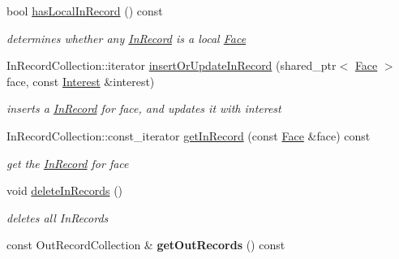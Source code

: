 \begin{DoxyCompactItemize}
\item 
bool \hyperlink{classnfd_1_1pit_1_1Entry_ab900fb305cf499f87be3b200b5ad8e14}{has\+Local\+In\+Record} () const
\begin{DoxyCompactList}\small\item\em determines whether any \hyperlink{classnfd_1_1pit_1_1InRecord}{In\+Record} is a local \hyperlink{classnfd_1_1Face}{Face} \end{DoxyCompactList}\item 
In\+Record\+Collection\+::iterator \hyperlink{classnfd_1_1pit_1_1Entry_aac1be4aca41141f5b601f4510fdd5df4}{insert\+Or\+Update\+In\+Record} (shared\+\_\+ptr$<$ \hyperlink{classnfd_1_1Face}{Face} $>$ face, const \hyperlink{classndn_1_1Interest}{Interest} \&interest)
\begin{DoxyCompactList}\small\item\em inserts a \hyperlink{classnfd_1_1pit_1_1InRecord}{In\+Record} for face, and updates it with interest \end{DoxyCompactList}\item 
In\+Record\+Collection\+::const\+\_\+iterator \hyperlink{classnfd_1_1pit_1_1Entry_a04589c934492a1376934f48ab444f11a}{get\+In\+Record} (const \hyperlink{classnfd_1_1Face}{Face} \&face) const
\begin{DoxyCompactList}\small\item\em get the \hyperlink{classnfd_1_1pit_1_1InRecord}{In\+Record} for face \end{DoxyCompactList}\item 
void \hyperlink{classnfd_1_1pit_1_1Entry_a9751df2fef9b681be7cffd63fb4abf6e}{delete\+In\+Records} ()\hypertarget{classnfd_1_1pit_1_1Entry_a9751df2fef9b681be7cffd63fb4abf6e}{}\label{classnfd_1_1pit_1_1Entry_a9751df2fef9b681be7cffd63fb4abf6e}

\begin{DoxyCompactList}\small\item\em deletes all In\+Records \end{DoxyCompactList}\item 
const Out\+Record\+Collection \& {\bfseries get\+Out\+Records} () const\hypertarget{classnfd_1_1pit_1_1Entry_a26525f6295962b92556cec62645c3a07}{}\label{classnfd_1_1pit_1_1Entry_a26525f6295962b92556cec62645c3a07}


\end{DoxyCompactItemize}
